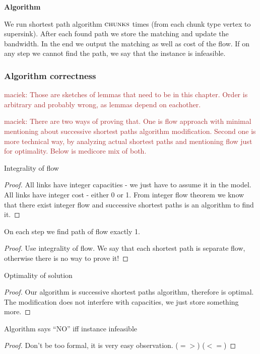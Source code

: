 \documentclass[9pt,twocolumn]{scrartcl}
\newcommand{\maciek}[1]{\textcolor{brown}{maciek: #1}}
\newcommand{\Chunks}{\ensuremath{\textsc{chunks}}}
\begin{document}
\textbf{Algorithm}

We run shortest path algorithm $\Chunks$ times (from each chunk type vertex to supersink). After each found path we store the matching and update the bandwidth. In the end we output the matching as well as cost of the flow. If on any step we cannot find the path, we say that the instance is infeasible.

\subsubsection{Algorithm correctness}

\maciek{Those are sketches of lemmas that need to be in this chapter. Order is arbitrary and probably wrong, as lemmas depend on eachother.}


\maciek{There are two ways of proving that. One is flow approach with minimal mentioning about successive shortest paths algorithm modification. Second one is more technical way, by analyzing actual shortest paths and mentioning flow just for optimality. Below is medicore mix of both.}

\begin{lemma}Integrality of flow
\end{lemma}
\begin{proof}
  All links have integer capacities - we just have to assume it in the model. All links have integer cost - either 0 or 1. From integer flow theorem we know that there exist integer flow and successive shortest paths is an algorithm to find it.
\end{proof}

\begin{lemma}
On each step we find path of flow exactly 1.
\end{lemma}
\begin{proof}
  Use integrality of flow. We say that each shortest path is separate flow, otherwise there is no way to prove it!
\end{proof}


\begin{lemma}Optimality of solution
\end{lemma}
\begin{proof}
Our algorithm is successive shortest paths algorithm, therefore is optimal. The modification does not interfere with capacities, we just store something more.  
\end{proof}


\begin{lemma}Algorithm says ``NO'' iff instance infeasible
\end{lemma}
\begin{proof}
  Don't be too formal, it is very easy observation.
  ($=>$)
  ($<=$)
\end{proof}
\end{document}
